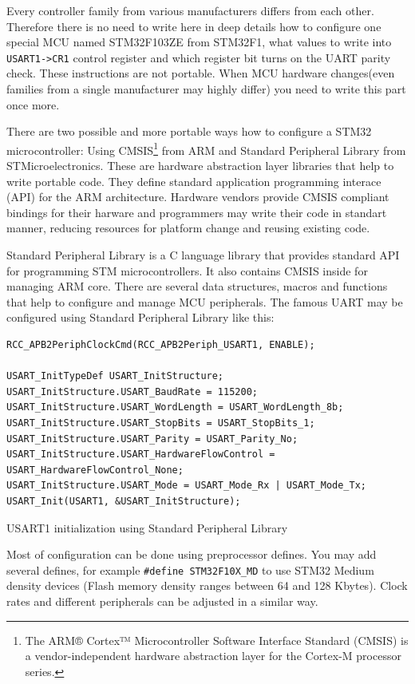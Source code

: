 Every controller family from various manufacturers differs from each other.
Therefore there is no need to write here in deep details how to configure one
special MCU named STM32F103ZE from STM32F1, what values to write into
\texttt{USART1->CR1} control register and which register bit turns on the UART
parity check. These instructions are not portable. When MCU hardware
changes(even families from a single manufacturer may highly differ) you need to
write this part once more.

There are two possible and more portable ways how to configure a STM32
microcontroller: Using CMSIS\footnote{The ARM® Cortex™ Microcontroller Software
Interface Standard (CMSIS) is a vendor-independent hardware abstraction layer for the Cortex-M processor series.}
from ARM and Standard Peripheral Library from STMicroelectronics. These are
hardware abstraction layer libraries that help to write portable code. They
define standard  application programming interace (API) for the ARM
architecture. Hardware vendors provide CMSIS compliant bindings for their
harware and programmers may write their code in standart manner, reducing
resources for platform change and reusing existing code.

Standard Peripheral Library is a C language library that provides standard API
for programming STM microcontrollers. It also contains CMSIS inside for
managing ARM core. There are several data structures, macros and functions that
help to configure and manage MCU peripherals.
The famous UART may be configured using Standard Peripheral Library like this:

\begin{listing}[H]
\begin{verbatim}
RCC_APB2PeriphClockCmd(RCC_APB2Periph_USART1, ENABLE);

USART_InitTypeDef USART_InitStructure;
USART_InitStructure.USART_BaudRate = 115200;
USART_InitStructure.USART_WordLength = USART_WordLength_8b;
USART_InitStructure.USART_StopBits = USART_StopBits_1;
USART_InitStructure.USART_Parity = USART_Parity_No;
USART_InitStructure.USART_HardwareFlowControl = USART_HardwareFlowControl_None;
USART_InitStructure.USART_Mode = USART_Mode_Rx | USART_Mode_Tx;
USART_Init(USART1, &USART_InitStructure);
\end{verbatim}
\caption{USART1 initialization using Standard Peripheral Library}
\label{lst:uart_init_example}
\end{listing} 

Most of configuration can be done using preprocessor defines.
You may add several defines, for example \texttt{#define STM32F10X_MD} to use
STM32 Medium density devices (Flash memory density ranges between 64 and 128
Kbytes). Clock rates and different peripherals can be adjusted in a similar way.

